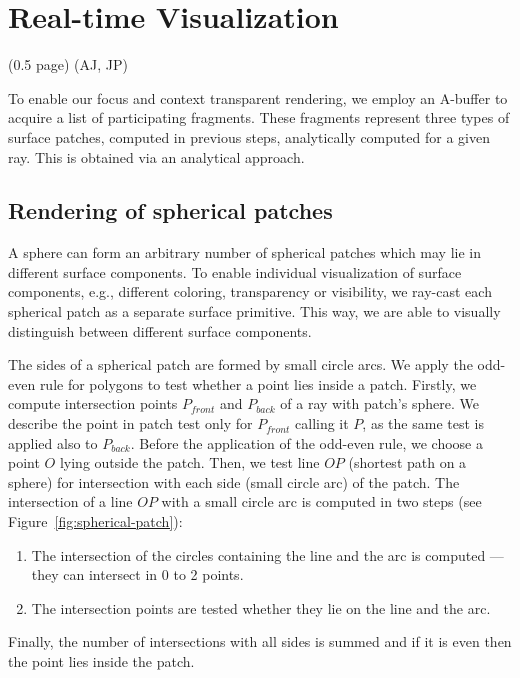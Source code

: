 \section{Real-time Visualization} (0.5 page) (AJ, JP)
\label{sec:vis}

To enable our focus and context transparent rendering, we employ an A-buffer to acquire a list of participating fragments.
These fragments represent three types of surface patches, computed in previous steps, analytically computed for a given ray.
This is obtained via an analytical approach.

\subsection{Rendering of spherical patches}
\label{sec:spherical-patches}

A sphere can form an arbitrary number of spherical patches which may lie in different surface components.
To enable individual visualization of surface components, e.g., different coloring, transparency or visibility, we ray-cast each spherical patch as a separate surface primitive.
This way, we are able to visually distinguish between different surface components.

The sides of a spherical patch are formed by small circle arcs.
We apply the odd-even rule for polygons \cite{shimrat1962algorithm} to test whether a point lies inside a patch.
Firstly, we compute intersection points $P_{front}$ and $P_{back}$ of a ray with patch's sphere.
We describe the point in patch test only for $P_{front}$ calling it $P$, as the same test is applied also to $P_{back}$.
Before the application of the odd-even rule, we choose a point $O$ lying outside the patch.
Then, we test line $OP$ (shortest path on a sphere) for intersection with each side (small circle arc) of the patch.
The intersection of a line $OP$ with a small circle arc is computed in two steps (see Figure~\ref{fig:spherical-patch}):
\begin{enumerate}
  \item The intersection of the circles containing the line and the arc is computed --- they can intersect in 0 to 2 points.
  \item The intersection points are tested whether they lie on the line and the arc.
\end{enumerate}
Finally, the number of intersections with all sides is summed and if it is even then the point lies inside the patch.

